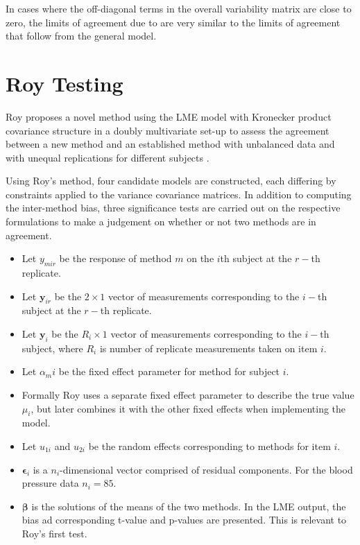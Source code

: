 \documentclass[12pt, a4paper]{report}
\theoremstyle{plain}
\theoremstyle{definition}
\theoremstyle{remark}
\begin{document}
	In cases where the off-diagonal terms in the overall variability
	matrix are close to zero, the limits of agreement due to
	\citet{BXC2008} are very similar to the limits of agreement that
	follow from the general model.
	
	\newpage
	
	
	
		
		\section{Roy Testing}
		
		Roy proposes a novel method using the LME model with Kronecker product covariance structure in a doubly multivariate set-up to assess the agreement between a new method and an established method with unbalanced data and with unequal replications for different subjects \citep{Roy}.
		
		Using Roy's method, four candidate models are constructed, each differing by constraints applied to the variance covariance matrices. In addition to computing the inter-method bias, three significance tests are carried out on the respective formulations to make a judgement on whether or not two methods are in agreement.
		
		\newpage
		\begin{itemize}
			\item Let $y_{mir}$ be the response of method $m$ on the $i$th subject
			at the $r-$th replicate.
			\item Let $\boldsymbol{y}_{ir}$ be the $2 \times 1$ vector of measurements
			corresponding to the $i-$th subject at the $r-$th replicate.
			\item Let $\boldsymbol{y}_{i}$ be the $R_i \times 1$ vector of
			measurements corresponding to the $i-$th subject, where $R_i$ is number of replicate measurements taken on item $i$.
			\item Let $\alpha_mi$ be the fixed effect parameter for method for subject $i$.
			\item Formally Roy uses a separate fixed effect parameter to describe the true value $\mu_i$, but later combines it with the other fixed effects when implementing the model.
			\item Let $u_{1i}$ and $u_{2i}$ be the random effects corresponding to methods for item $i$.
			
			\item $\boldsymbol{\epsilon}_{i}$ is a $n_{i}$-dimensional vector
			comprised of residual components. For the blood pressure data $n_{i} = 85$.
			
			\item $\boldsymbol{\beta}$ is the solutions of the means of the two methods. In the LME output, the bias ad corresponding
			t-value and p-values are presented. This is relevant to Roy's first test.\end{itemize}
		
\end{document}
